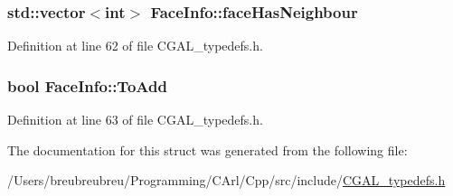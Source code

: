 \subsubsection[{face\+Has\+Neighbour}]{\setlength{\rightskip}{0pt plus 5cm}std\+::vector$<$int$>$ Face\+Info\+::face\+Has\+Neighbour}\label{struct_face_info_ad06cd2e3c94cb64c7b286237516ce6f8}


Definition at line 62 of file C\+G\+A\+L\+\_\+typedefs.\+h.

\hypertarget{struct_face_info_a5b2ee108652a00946acaa87f8f98d56f}{}
\subsubsection[{To\+Add}]{\setlength{\rightskip}{0pt plus 5cm}bool Face\+Info\+::\+To\+Add}\label{struct_face_info_a5b2ee108652a00946acaa87f8f98d56f}


Definition at line 63 of file C\+G\+A\+L\+\_\+typedefs.\+h.



The documentation for this struct was generated from the following file\+:\begin{DoxyCompactItemize}
\item 
/\+Users/breubreubreu/\+Programming/\+C\+Arl/\+Cpp/src/include/\hyperlink{_c_g_a_l__typedefs_8h}{C\+G\+A\+L\+\_\+typedefs.\+h}\end{DoxyCompactItemize}
